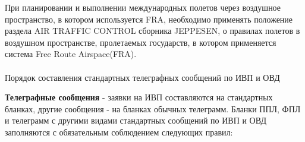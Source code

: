При планировании и выполнении международных полетов через воздушное пространство, в котором используется FRA, необходимо применять положение раздела AIR TRAFFIC CONTROL сборника JEPPESEN, о правилах полетов в воздушном пространстве, пролетаемых государств, в котором применяется система Free Route Airspace(FRA).

\paragraph{} Порядок составления стандартных телеграфных сообщений по ИВП и ОВД

\textbf{Телеграфные сообщения} - заявки на ИВП составляются на стандартных бланках, другие сообщения - на бланках обычных телеграмм.
Бланки ППЛ, ФПЛ и телеграмм с другими видами стандартных сообщений по ИВП и ОВД заполняются с обязательным соблюдением следующих правил:
